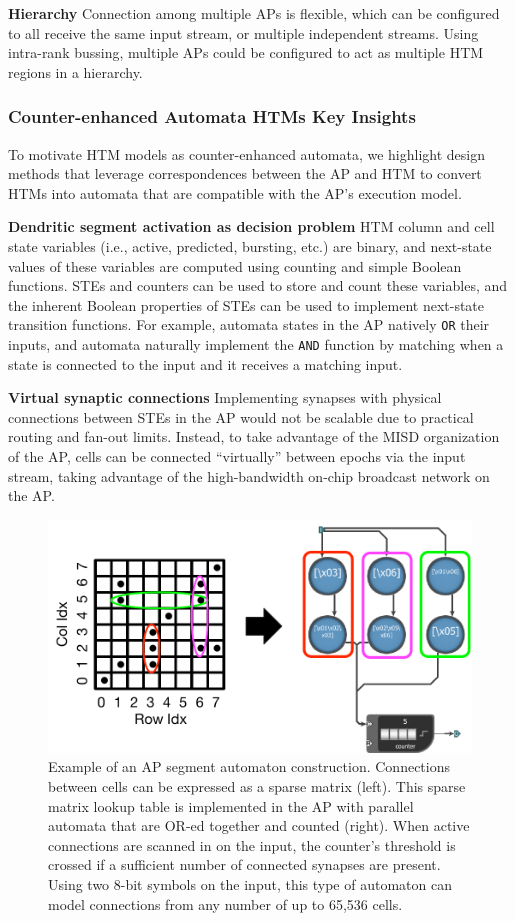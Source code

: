 \textbf{Hierarchy}
Connection among multiple APs is flexible, which can be configured to all receive the same input stream, or multiple independent streams.
Using intra-rank bussing, multiple APs could be configured to act as multiple HTM regions in a hierarchy.

\subsubsection{Counter-enhanced Automata HTMs Key Insights}

To motivate HTM models as counter-enhanced automata, we highlight design methods that leverage correspondences between the AP and HTM to convert HTMs into automata that are compatible with the AP's execution model.

\textbf{Dendritic segment activation as decision problem}
HTM column and cell state variables (i.e., active, predicted, bursting, etc.) are binary, and next-state values of these variables are computed using counting and simple Boolean functions.
STEs and counters can be used to store and count these variables, and the inherent Boolean properties of STEs can be used to implement next-state transition functions.
For example, automata states in the AP natively \texttt{OR} their inputs, and automata naturally implement the \texttt{AND} function by matching when a state is connected to the input and it receives a matching input.

\textbf{Virtual synaptic connections}
Implementing synapses with physical connections between STEs in the AP would not be scalable due to practical routing and fan-out limits.
Instead, to take advantage of the MISD organization of the AP, cells can be connected ``virtually'' between epochs via the input stream, taking advantage of the high-bandwidth on-chip broadcast network on the AP.

\begin{figure}
    \centering
    \includegraphics[width=0.5\linewidth]{figs/sparse_matrix_widget.pdf}
    \caption{Example of an AP segment automaton construction.
    Connections between cells can be expressed as a sparse matrix (left).
    This sparse matrix lookup table is implemented in the AP with parallel automata that are OR-ed together and counted (right).
    When active connections are scanned in on the input, the counter's threshold is crossed if a sufficient number of connected synapses are present.
    Using two 8-bit symbols on the input, this type of automaton can model connections from any number of up to 65,536 cells.\label{fig:sparse_matrix_widget}}
\end{figure}

